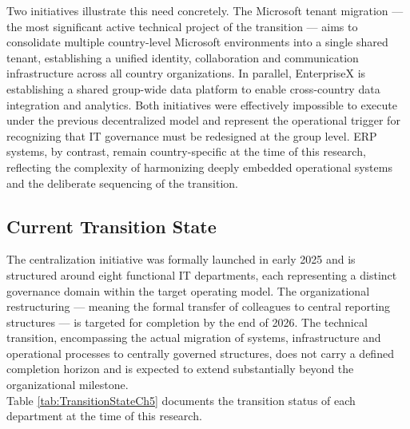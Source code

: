 Two initiatives illustrate this need concretely.
The Microsoft tenant migration — the most significant active technical project of the transition — aims to consolidate multiple country-level Microsoft environments into a single shared tenant, establishing a unified identity, collaboration and communication infrastructure across all country organizations.
In parallel, EnterpriseX is establishing a shared group-wide data platform to enable cross-country data integration and analytics.
Both initiatives were effectively impossible to execute under the previous decentralized model and represent the operational trigger for recognizing that IT governance must be redesigned at the group level.
ERP systems, by contrast, remain country-specific at the time of this research, reflecting the complexity of harmonizing deeply embedded operational systems and the deliberate sequencing of the transition.

\subsection{Current Transition State}
\label{subsec:CurrentTransitionState}
The centralization initiative was formally launched in early 2025 and is structured around eight functional IT departments, each representing a distinct governance domain within the target operating model.
The organizational restructuring — meaning the formal transfer of colleagues to central reporting structures — is targeted for completion by the end of 2026.
The technical transition, encompassing the actual migration of systems, infrastructure and operational processes to centrally governed structures, does not carry a defined completion horizon and is expected to extend substantially beyond the organizational milestone.
\\
Table \ref{tab:TransitionStateCh5} documents the transition status of each department at the time of this research.

